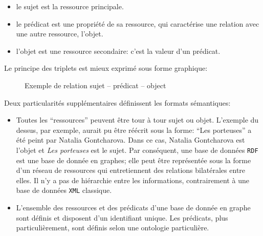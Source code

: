 \documentclass[a4paper, 12pt, twoside]{book}
\newcommand{\rdf}{\texttt{RDF}}
\newcommand{\xml}{\texttt{XML}}
\begin{document}
\begin{itemize}
	\item le sujet est la ressource principale.
	\item le prédicat est une propriété de sa ressource, qui caractérise une relation avec une autre ressource, l'objet.
	\item l'objet est une ressource secondaire: c'est la valeur d'un prédicat.
\end{itemize}

Le principe des triplets est mieux exprimé sous forme graphique:

\begin{figure}[!h]
	\centering
	\caption{Exemple de relation sujet -- prédicat -- object}
\end{figure}

Deux particularités supplémentaires définissent les formats sémantiques:
\begin{itemize}
	\item Toutes les \enquote{ressources} peuvent être tour à tour sujet ou objet. L'exemple du dessus, par exemple, aurait pu être réécrit sous la forme: \enquote{Les porteuses} a été peint par Natalia Gontcharova. Dans ce cas, Natalia Gontcharova est l'objet et \textit{Les porteuses} est le sujet. Par conséquent, une base de données \rdf{} est une base de donnée en graphes; elle peut être représentée sous la forme d'un réseau de ressources qui entretiennent des relations bilatérales entre elles. Il n'y a pas de hiérarchie entre les informations, contrairement à une base de données \xml{} classique.
	\item L'ensemble des ressources et des prédicats d'une base de donnée en graphe sont définis et disposent d'un identifiant unique. Les prédicats, plus particulièrement, sont définis selon une ontologie particulière.
\end{itemize}
\end{document}
